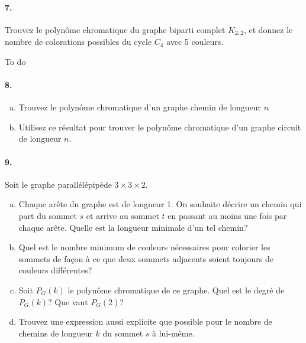 \paragraph{7. } Trouvez le polynôme chromatique du graphe biparti complet $K_{2,2}$, et donnez le nombre de colorations possibles du cycle $C_4$ avec 5 couleurs.
\begin{solution}
  To do
\end{solution}

\paragraph{8. }
\begin{enumerate}[(a)]
  \item Trouvez le polynôme chromatique d'un graphe chemin de longueur $n$
  \item Utilisez ce résultat pour trouver le polynôme chromatique d'un graphe circuit de longueur $n$.
\end{enumerate}

\paragraph{9. } Soit le graphe parallélépipède $3 \times 3 \times 2$.

\begin{enumerate}[(a)]
  \item Chaque arête du graphe est de longueur 1. On souhaite décrire un chemin qui part du sommet $s$ et arrive au sommet $t$ en passant au moins une fois par chaque arête. Quelle est la longueur minimale d'un tel chemin?
  \item Quel est le nombre minimum de couleurs nécessaires pour colorier les sommets de façon à ce que deux sommets adjacents soient toujours de couleurs différentes?
  \item Soit $P_G(k)$ le polynôme chromatique de ce graphe. Quel est le degré de $P_G(k)$? Que vaut $P_G(2)$?
  \item Trouvez une expression aussi explicite que possible pour le nombre de chemins de longueur $k$ du sommet $s$ à lui-même.
\end{enumerate}

\begin{figure}[h!]
  \centering
\end{figure}
